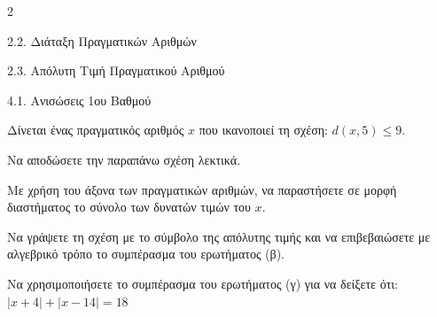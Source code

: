\begin{ylh}{2}
    \item 2.2. Διάταξη Πραγματικών Αριθμών
    \item 2.3. Απόλυτη Τιμή Πραγματικού Αριθμού
    \item 4.1. Ανισώσεις 1ου Βαθμού
\end{ylh}
Δίνεται ένας πραγματικός αριθμός $x$ που ικανοποιεί τη σχέση: $d(x, 5) \le 9$.\\
\begin{alist}
\item Να αποδώσετε την παραπάνω σχέση λεκτικά.
\item Με χρήση του άξονα των πραγματικών αριθμών, να παραστήσετε σε μορφή\\
διαστήματος το σύνολο των δυνατών τιμών του $x$.
\item Να γράψετε τη σχέση με το σύμβολο της απόλυτης τιμής και να επιβεβαιώσετε με αλγεβρικό τρόπο το συμπέρασμα του ερωτήματος (β).

\item Να χρησιμοποιήσετε το συμπέρασμα του ερωτήματος (γ) για να δείξετε ότι: $|x + 4| + |x - 14| = 18$
\end{alist}

